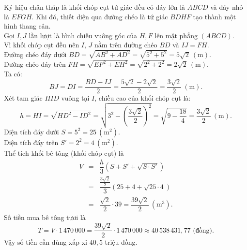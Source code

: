 \begin{ex}
{		\noindent Ký hiệu chân tháp là khối chóp cụt tứ giác đều có đáy lớn là $ABCD$ và đáy nhỏ là $EFGH$. Khi đó, thiết diện qua đường chéo là tứ giác $BDHF$ tạo thành một hình thang cân.\\
		Gọi $I, J$ lần lượt là hình chiếu vuông góc của $H, F$ lên mặt phẳng $(ABCD)$. \\
		Vì khối chóp cụt đều nên $I$, $J$ nằm trên đường chéo $BD$ và $IJ = FH$.\\
		Đường chéo đáy dưới $BD = \sqrt{AB^2+AD^2} = \sqrt{5^2+5^2} = 5\sqrt{2} \ (\text{m})$.\\
		Đường chéo đáy trên $FH = \sqrt{EF^2+EH^2} = \sqrt{2^2+2^2} = 2\sqrt{2} \ (\text{m})$.\\
		Ta có: 
		\[ BJ = DI = \dfrac{BD - IJ}{2} = \dfrac{5\sqrt{2} - 2\sqrt{2}}{2} = \dfrac{3\sqrt{2}}{2} \ (\text{m}). \]
		Xét tam giác $HID$ vuông tại $I$, chiều cao của khối chóp cụt là:
		\[ h = HI = \sqrt{HD^2 - ID^2} = \sqrt{3^2 - \left(\dfrac{3\sqrt{2}}{2}\right)^2} = \sqrt{9 - \dfrac{18}{4}} = \dfrac{3\sqrt{2}}{2} \ (\text{m}). \]
		Diện tích đáy dưới $S = 5^2 = 25 \ (\text{m}^2)$.\\
		Diện tích đáy trên $S' = 2^2 = 4 \ (\text{m}^2)$.\\
		Thể tích khối bê tông (khối chóp cụt) là
		\allowdisplaybreaks
		\begin{eqnarray*}
			V &=& \dfrac{h}{3}\left(S + S' + \sqrt{S \cdot S'}\right) \\
			&=& \dfrac{\frac{3\sqrt{2}}{2}}{3}\left(25 + 4 + \sqrt{25 \cdot 4}\right) \\
			&=& \dfrac{\sqrt{2}}{2} \cdot 39 = \dfrac{39\sqrt{2}}{2} \ (\text{m}^3).
		\end{eqnarray*}
		Số tiền mua bê tông tươi là
		\[ T = V \cdot 1\,470\,000 = \dfrac{39\sqrt{2}}{2} \cdot 1\,470\,000 \approx 40\,538\,431{,}77 \text{ (đồng)}. \]
		Vậy số tiền cần dùng xấp xỉ $40{,}5$ triệu đồng.
	}
\end{ex}

